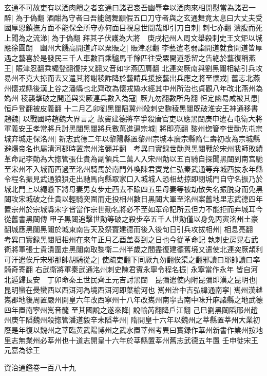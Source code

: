 玄通不可故吏有以酒肉饋之者玄通曰諸君哀吾幽辱幸以酒肉來相開慰當為諸君一醉|{
	為于偽翻}
酒酣為守者曰吾能劒舞願假五口刀守者與之玄通舞竟太息曰大丈夫受國厚恩鎮撫方面不能保全所守亦何面目視息世間哉即引刀自刺|{
	刺七亦翻}
潰腹而死上聞為之流涕|{
	為于偽翻}
拜其子伏護為大將　庚戌杞州人周文舉殺刺史王文矩以城應徐圓朗　幽州大饑高開道許以粟賑之|{
	賑津忍翻}
李藝遣老弱詣開道就食開道皆厚遇之藝喜於是發民三千人車數百乘驢馬千餘匹往受粟開道悉留之告絶於藝復稱燕王|{
	賑津忍翻乘繩登翻復扶又翻又音如字燕囚肩翻}
北連突厥南與劉黑闥相結引兵攻易州不克大掠而去又遣其將謝稜詐降於藝請兵援接藝出兵應之將至懷戎|{
	舊志北燕州懷戎縣後漢上谷之潘縣也北齊改為懷戎媯水經其中州所治也貞觀八年改北燕州為媯州}
稜襲擊破之開道與突厥連兵數入為寇|{
	厥九勿翻數所角翻}
恒定幽易咸被其患|{
	恒戶登翻被皮義翻}
十二月乙卯劉黑闥䧟冀州殺刺史麴稜黑闥既破淮安王神通移書趙魏|{
	以戰國時趙魏大界言之}
故竇建德將卒爭殺唐官吏以應黑闥庚申遣右屯衛大將軍義安王孝常將兵討黑闥黑闥將兵數萬進逼宗城|{
	將即亮翻}
黎州揔管李世勣先屯宗城弃城走保洺州|{
	新志武德二年以黎陽縣置黎州宗城本廣宗縣隋仁壽初改為宗城縣避煬帝名也屬清河郡時置宗州洺彌并翻　考異曰實録世勣與黑闥戰於宋州我師敗績革命記李勣為大揔管張仕貴為副領兵二萬人入宋州勣以五百騎自探聞黑闥到南宫馳至宋州不入城而西過至洺州騎馬於南門外喚陳君賓党仁弘秦武通等弃城西抜永年縣令程名振見武通狼狽走出馳馬向縣取家口入城城人恐相劫掠即閉城門自守名振乃於城北門上以繩懸下將母妻男女步走西去不踰四五里母妻等被劫散失名振脱身而免黑闥攻宋城破之仕貴以輕騎突圍而走投相州數日黑闥大軍至洺州案舊地里志武德四年置宗州於宗城縣宋字皆當作宗世勣名將必不至如革命記所云但力不能拒而弃城耳今從舊書黑闥傳}
甲子黑闥追擊世勣等破之殺步卒五千人世勣僅以身免丙寅洺州土豪翻城應黑闥黑闥於城東南告天及祭竇建德而後入後旬日引兵攻拔相州|{
	相息亮翻　考異曰實録黑闥䧟相州在來年正月乙酉盖奏到之日也今從革命記}
執刺史房晃右武衛將軍張士貴潰圍走黑闥南取黎衛二州半歲之間盡復建德舊境又遣使北連突厥頡利可汗遣俟斤宋邪那帥胡騎從之|{
	使疏吏翻下同厥九勿翻俟渠之翻邪讀曰耶帥讀曰率騎奇寄翻}
右武衛將軍秦武通洺州刺史陳君賓永寧令程名振|{
	永寧當作永年}
皆自河北遁歸長安　丁卯命秦王世民齊王元吉討黑闥　昆彌遣使内附昆彌即漢之昆明也|{
	昆明蠻在㸑蠻西以西洱河為境西洱河即葉榆河也}
嶲州治中吉弘緯通南寜|{
	嶲州漢越嶲郡地後周置嚴州開皇六年改西寧州十八年改嶲州南寜古南中味升麻諸縣之地武德四年置南寧州嶲音髓}
至其國說之遂來降|{
	說輸芮翻降戶江翻}
己巳劉黑闥䧟邢州趙州庚午䧟魏州殺揔管潘道毅辛未䧟莘州|{
	隋開皇十六年以魏州之莘縣置莘州大業初廢是年復以魏州之莘臨黄武陽博州之武水置莘州考異曰實録作華州新書作業州按地里志無業州必莘州也十道志開皇十六年於莘縣置莘州舊志武德五年置}
壬申徙宋王元嘉為徐王

資治通鑑卷一百八十九
